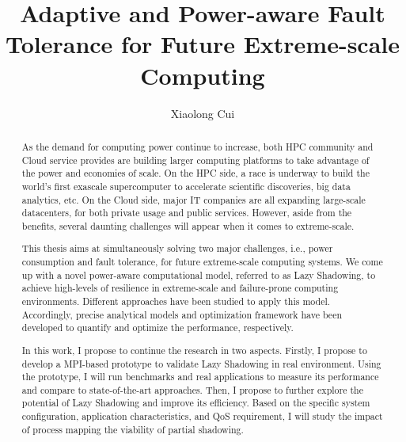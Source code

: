 \documentclass[driverfallback=dvipdfmx,final]{pittetd}
\title[Adaptive and Power-aware Fault Tolerance for Future Extreme-scale Computing]
{Adaptive and Power-aware Fault Tolerance for Future Extreme-scale Computing}
\author{Xiaolong Cui}
\begin{document}
\maketitle
%
\makecommittee
\copyrightpage                     %
\begin{abstract}
As the demand for computing power continue to increase, both HPC community and Cloud service provides are building larger computing platforms to take advantage of the power and economies of scale. On the HPC side, %
a race is underway to build the world's first exascale supercomputer 
to accelerate scientific discoveries, big data analytics, etc. On the Cloud side, major IT companies are all expanding large-scale datacenters, for both private usage and public services. However, aside from the benefits, several daunting challenges will appear when it comes to extreme-scale.

This thesis aims at simultaneously solving two major challenges, i.e., power consumption and fault tolerance, for future extreme-scale computing systems. We come up with a novel power-aware computational model, referred to as Lazy Shadowing, to achieve high-levels of resilience in extreme-scale and failure-prone computing environments. Different approaches have been studied to apply this model. Accordingly, precise analytical models and optimization framework have been developed to quantify and optimize the performance, respectively. 

In this work, I propose to continue the research in two aspects. Firstly, I propose to develop a MPI-based prototype to validate Lazy Shadowing in real environment. Using the prototype, I will run benchmarks and real applications to measure its performance and compare to state-of-the-art approaches. Then, I propose to further explore the potential of Lazy Shadowing and improve its efficiency. Based on the specific system configuration, application characteristics, and QoS requirement, I will study 
the impact of process mapping the viability of partial shadowing.     

\end{abstract}
\end{document}
